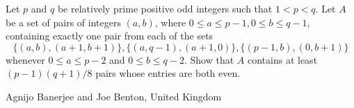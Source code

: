 Let $p$ and $q$ be relatively prime positive odd integers such that $1 < p < q$. Let $A$ be a set of pairs of integers $(a, b)$, where $0 \le a \le p - 1, 0 \le b \le q - 1$, containing exactly one pair from each of the sets $$\{(a, b),(a + 1, b + 1)\},  \{(a, q - 1), (a + 1, 0)\}, \{(p - 1,b),(0, b + 1)\}$$whenever $0 \le a \le p - 2$ and $0 \le b \le q - 2$. Show that $A$ contains at least $(p - 1)(q + 1)/8$ pairs whose entries are both even.

Agnijo Banerjee and Joe Benton, United Kingdom